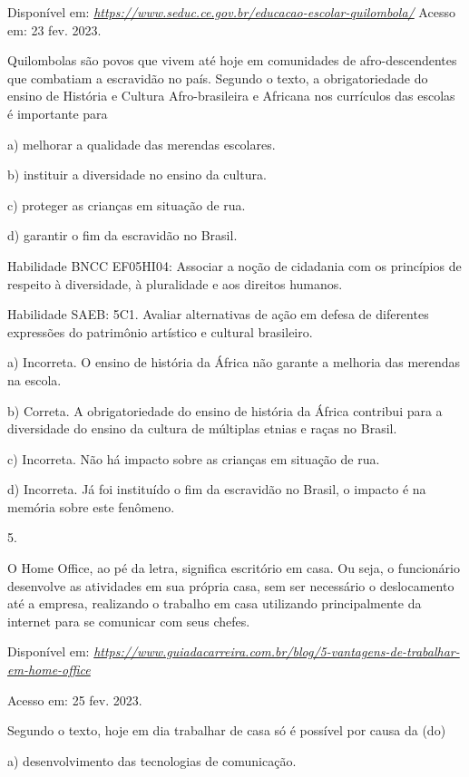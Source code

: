 Disponível em:
\href{https://www.seduc.ce.gov.br/educacao-escolar-quilombola/}{\emph{https://www.seduc.ce.gov.br/educacao-escolar-quilombola/}}
Acesso em: 23 fev. 2023.

Quilombolas são povos que vivem até hoje em comunidades de
afro-descendentes que combatiam a escravidão no país. Segundo o texto, a
obrigatoriedade do ensino de História e Cultura Afro-brasileira e
Africana nos currículos das escolas é importante para

a) melhorar a qualidade das merendas escolares.

b) instituir a diversidade no ensino da cultura.

c) proteger as crianças em situação de rua.

d) garantir o fim da escravidão no Brasil.

Habilidade BNCC EF05HI04: Associar a noção de cidadania com os
princípios de respeito à diversidade, à pluralidade e aos direitos
humanos.

Habilidade SAEB: 5C1. Avaliar alternativas de ação em defesa de
diferentes expressões do patrimônio artístico e cultural brasileiro.

a) Incorreta. O ensino de história da África não garante a melhoria das
merendas na escola.

b) Correta. A obrigatoriedade do ensino de história da África contribui
para a diversidade do ensino da cultura de múltiplas etnias e raças no
Brasil.

c) Incorreta. Não há impacto sobre as crianças em situação de rua.

d) Incorreta. Já foi instituído o fim da escravidão no Brasil, o impacto
é na memória sobre este fenômeno.

5.

O Home Office, ao pé da letra, significa escritório em casa. Ou seja, o
funcionário desenvolve as atividades em sua própria casa, sem ser
necessário o deslocamento até a empresa, realizando o trabalho em casa
utilizando principalmente da internet para se comunicar com seus chefes.

Disponível em:
\href{https://www.guiadacarreira.com.br/blog/5-vantagens-de-trabalhar-em-home-office}{\emph{https://www.guiadacarreira.com.br/blog/5-vantagens-de-trabalhar-em-home-office}}

Acesso em: 25 fev. 2023.

Segundo o texto, hoje em dia trabalhar de casa só é possível por causa
da (do)

a) desenvolvimento das tecnologias de comunicação.

